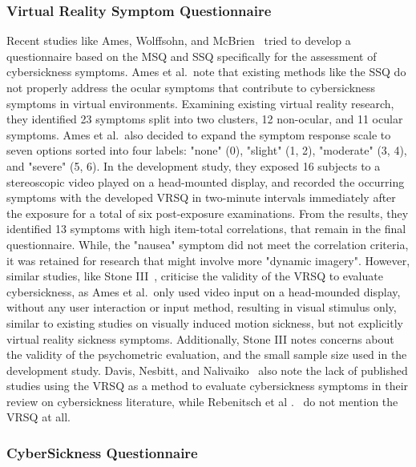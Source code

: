 \subsubsection{Virtual Reality Symptom Questionnaire}\label{subsubsec:virtual-reality-symptom-questionnaire}

Recent studies like Ames, Wolffsohn, and McBrien~\cite{Ames2005} tried to develop a questionnaire based on the MSQ
and SSQ specifically for the assessment of cybersickness symptoms.
Ames et al.\ note that existing methods like the SSQ do not properly address the ocular symptoms that
contribute to cybersickness symptoms in virtual environments.
Examining existing virtual reality research, they identified 23 symptoms split into two clusters, 12 non-ocular, and
11 ocular symptoms.
Ames et al.\ also decided to expand the symptom response scale to seven options sorted into four
labels: "none" (0), "slight" (1, 2), "moderate" (3, 4), and "severe" (5, 6).
In the development study, they exposed 16 subjects to a stereoscopic video played on a
head-mounted display, and recorded the occurring symptoms with the developed VRSQ in two-minute
intervals immediately after the exposure for a total of six post-exposure examinations.
From the results, they identified 13 symptoms with high item-total correlations, that remain in the final
questionnaire.
While, the "nausea" symptom did not meet the correlation criteria, it was retained for research that might involve
more "dynamic imagery".
However, similar studies, like Stone III~\cite{Stone2017}, criticise the validity of the VRSQ to evaluate
cybersickness, as Ames et al.\ only used video input on a head-mounded display, without any user interaction or input
method, resulting in visual stimulus only, similar to existing studies on visually induced motion sickness, but not
explicitly virtual reality sickness symptoms.
Additionally, Stone III notes concerns about the validity of the psychometric evaluation, and the small sample size
used in the development study.
Davis, Nesbitt, and Nalivaiko~\cite{Davis2014} also note the lack of published studies using the VRSQ as a method to
evaluate cybersickness symptoms in their review on cybersickness literature, while Rebenitsch et al
.~\cite{Rebenitsch2016} do not mention the VRSQ at all.

\subsubsection{CyberSickness Questionnaire}\label{subsubsec:cybersickness-questionnaire}

